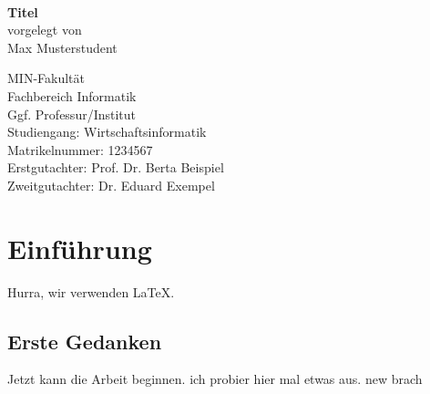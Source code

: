\documentclass[11pt,a4paper]{scrbook}
\begin{document}
\frontmatter
{}
\begin{titlepage}

\vspace*{2cm}
\Large
\begin{center} 
      {\color{uhhred}\textbf{}}
\vspace*{2.0cm}\\
{\LARGE \textbf{Titel}}
\vspace*{2.0cm}\\
vorgelegt von
\vspace*{0.4cm}\\
Max Musterstudent
\end{center}
\vspace*{3.9cm}

\noindent 
MIN-Fakultät \vspace*{0.4cm} \\ 
Fachbereich Informatik \vspace*{0.4cm} \\ 
Ggf. Professur/Institut \vspace*{0.4cm} \\
Studiengang: Wirtschaftsinformatik \vspace*{0.4cm} \\ 
Matrikelnummer: 1234567 \vspace*{0.8cm} \\ 
Erstgutachter: Prof. Dr. Berta Beispiel \vspace*{0.4cm} \\ 
Zweitgutachter: Dr. Eduard Exempel

\end{titlepage}

\restoregeometry

\tableofcontents

\mainmatter 

\chapter{Einführung}

Hurra, wir verwenden \LaTeX.

\section{Erste Gedanken}

Jetzt kann die Arbeit beginnen. ich probier hier mal etwas aus. new brach
\end{document}
